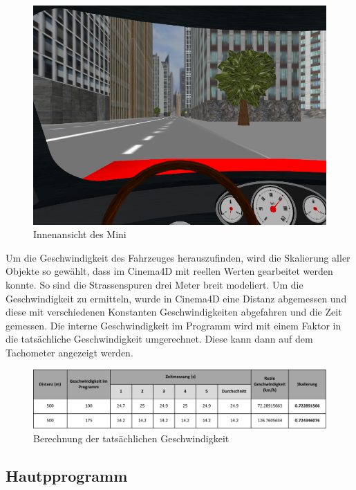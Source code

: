 \begin{figure}[H]
\centering 
\includegraphics[width=1\linewidth]{src/screenshot_cockpit.png}
\caption{Innenansicht des Mini} %
\label{screenshot_cockpit} %
\end{figure}
Um die Geschwindigkeit des Fahrzeuges herauszufinden, wird die Skalierung aller Objekte so gewählt, dass im Cinema4D mit reellen Werten gearbeitet werden konnte. So sind die Strassenspuren drei Meter breit modeliert. Um die Geschwindigkeit zu ermitteln, wurde in Cinema4D eine Distanz abgemessen und diese mit verschiedenen Konstanten Geschwindigkeiten abgefahren und die Zeit gemessen. Die interne Geschwindigkeit im Programm wird mit einem Faktor in die tatsächliche Geschwindigkeit umgerechnet. Diese kann dann auf dem Tachometer angezeigt werden.\\
\begin{figure}[H]
\centering 
\includegraphics[width=1\linewidth]{src/geschwindigkeitsberechnung.pdf}
\caption{Berechnung der tatsächlichen Geschwindigkeit} %
\label{berechnung_geschwindigkeit} %
\end{figure}

\newpage
\subsection{Hautpprogramm}

